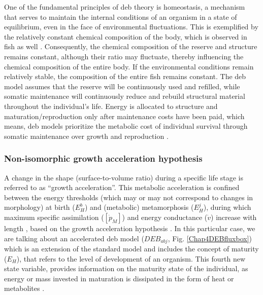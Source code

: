 One of the fundamental principles of \acrshort{deb} theory is homeostasis, a mechanism that serves to maintain the internal conditions of an organism in a state of equilibrium, even in the face of environmental fluctuations. This is exemplified by the relatively constant chemical composition of the body, which is observed in fish as well \citep{Kooi2009}. Consequently, the chemical composition of the reserve and structure remains constant, although their ratio may fluctuate, thereby influencing the chemical composition of the entire body. If the environmental conditions remain relatively stable, the composition of the entire fish remains constant. The \acrshort{deb} model assumes that the reserve will be continuously used and refilled, while somatic maintenance will continuously reduce and rebuild structural material throughout the individual's life. Energy is allocated to structure and maturation/reproduction only after maintenance costs have been paid, which means, \acrshort{deb} models prioritize the metabolic cost of individual survival through somatic maintenance over growth and reproduction \citep{Kooi2009,JusuSous2017}.\\

\subsubsection{Non-isomorphic growth acceleration hypothesis}

A change in the shape (surface-to-volume ratio) during a specific life stage is referred to as ``growth acceleration''. This metabolic acceleration is confined between the energy thresholds (which may or may not correspond to changes in morphology) at birth ($E_H^b$) and (metabolic) metamorphosis ($E_H^j$), during which maximum specific assimilation ($\left [ \dot{p}_{M} \right ]$) and energy conductance ($\dot{v}$) increase with length \citep{KooiLika2014}, based on the growth acceleration hypothesis \citep{OsseBoog1997,JohnBjor2001,WalkMcCo2004,PaulFroe2023}. In this particular case, we are talking about an accelerated \acrshort{deb} model ($DEB_{abj}$, Fig. \ref{Chap4DEBfluxbox}) which is an extension of the standard model and includes the concept of maturity ($E_{H}$), that refers to the level of development of an organism. This fourth new state variable, provides information on the maturity state of the individual, as energy or mass invested in maturation is dissipated in the form of heat or metabolites \citep{JusuKlan2011}.

